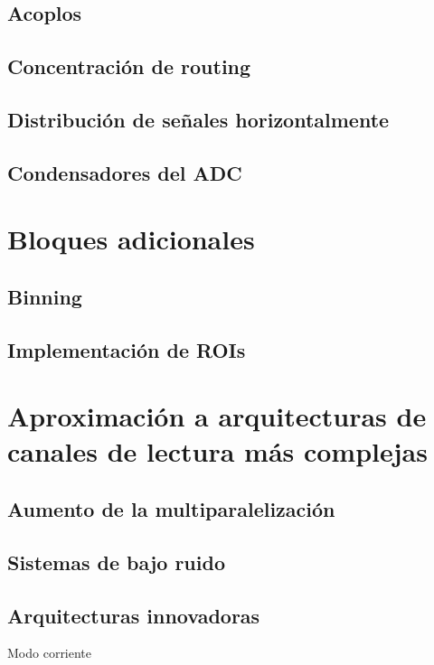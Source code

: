 \subsection{Acoplos}

\subsection{Concentración de routing}


\subsection{Distribución de señales horizontalmente}

\subsection{Condensadores del ADC}

\section{Bloques adicionales}


\subsection{Binning}

\subsection{Implementación de ROIs}

\section{Aproximación a arquitecturas de canales de lectura más complejas}

\subsection{Aumento de la multiparalelización}

\subsection{Sistemas de bajo ruido}

\subsection{Arquitecturas innovadoras}
Modo corriente
